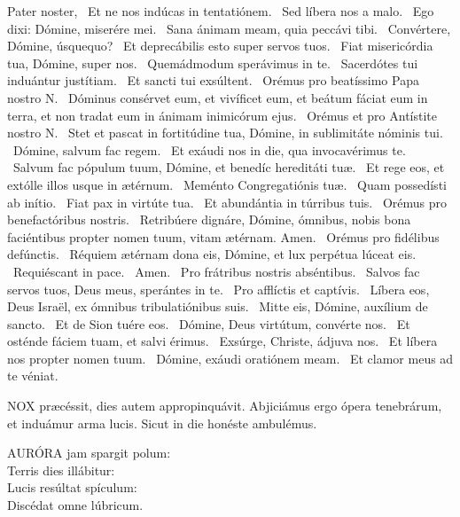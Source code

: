 Pater noster,  \V\ Et ne nos indúcas in tentatiónem. \R\ Sed líbera nos a malo. \V\ Ego dixi: Dómine, miserére mei. \R\ Sana ánimam meam, quia peccávi tibi. \V\ Convértere, Dómine, úsquequo? \R\ Et deprecábilis esto super servos tuos. \V\ Fiat misericórdia tua, Dómine, super nos. \R\ Quemádmodum sperávimus in te. \V\ Sacerdótes tui induántur justítiam. \R\ Et sancti tui exsúltent. \V\ Orémus pro beatíssimo Papa nostro N. \R\ Dóminus consérvet eum, et vivíficet eum, et beátum fáciat eum in terra, et non tradat eum in ánimam inimicórum ejus. \V\ Orémus et pro Antístite nostro N. \R\ Stet et pascat in fortitúdine tua, Dómine, in sublimitáte nóminis tui. \V\ Dómine, salvum fac regem. \R\ Et exáudi nos in die, qua invocavérimus te. \V\ Salvum fac pópulum tuum, Dómine, et benedíc hereditáti tuæ. \R\ Et rege eos, et extólle illos usque in ætérnum. \V\ Meménto Congregatiónis tuæ. \R\ Quam possedísti ab inítio. \V\ Fiat pax in virtúte tua. \R\ Et abundántia in túrribus tuis. \V\ Orémus pro benefactóribus nostris. \R\ Retribúere dignáre, Dómine, ómnibus, nobis bona faciéntibus propter nomen tuum, vitam ætérnam. Amen. \V\ Orémus pro fidélibus defúnctis. \R\ Réquiem ætérnam dona eis, Dómine, et lux perpétua lúceat eis. \V\ Requiéscant in pace. \R\ Amen. \V\ Pro frátribus nostris abséntibus. \R\ Salvos fac servos tuos, Deus meus, sperántes in te. \V\ Pro afflíctis et captívis. \R\ Líbera eos, Deus Israël, ex ómnibus tribulatiónibus suis. \V\ Mitte eis, Dómine, auxílium de sancto. \R\ Et de Sion tuére eos. \V\ Dómine, Deus virtútum, convérte nos. \R\ Et osténde fáciem tuam, et salvi érimus. \V\ Exsúrge, Christe, ádjuva nos. \R\ Et líbera nos propter nomen tuum. \V\ Dómine, exáudi oratiónem meam. \R\ Et clamor meus ad te véniat.




\lettrine[lines=2]{N}{OX} præcéssit, dies autem appropinquávit. Abjiciámus ergo ópera tenebrárum, et induámur arma lucis. Sicut in die honéste ambulémus.


\lettrine[lines=2]{A}{URÓRA} jam spargit polum:\\
Terris dies illábitur:\\
Lucis resúltat spículum:\\
Discédat omne lúbricum.

